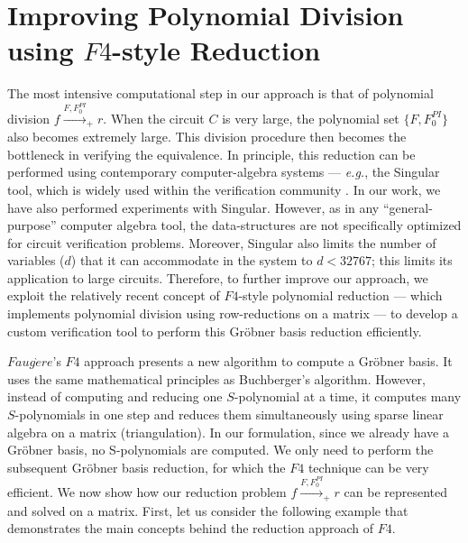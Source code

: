 \section{Improving Polynomial Division using $F4$-style Reduction}
\label{sec:f4}

The most intensive computational step in our approach is that of
polynomial division $f \stackrel{F,F_0^{PI}}{\longrightarrow}_+
r$. When the circuit $C$ is very large, the polynomial set
$\{F, F_0^{PI}\}$ also becomes extremely large. This division
procedure then becomes the bottleneck in verifying the equivalence.  
In principle, this reduction can be performed using contemporary
computer-algebra systems --- {\it e.g.},  the {\sc Singular}
\cite{DGPS} tool, which is widely used within the verification
community \cite{wienand:cav08} \cite{wedler:date11}
\cite{lv:date2012}. In our work, we have also performed experiments 
with {\sc Singular}. However, as in any ``general-purpose''
computer algebra tool, the data-structures are not specifically
optimized for circuit verification problems. Moreover, {\sc
  Singular} also limits the number of variables ($d$) that it can
accommodate in the system to $d < 32767$; this limits its
application to large circuits. Therefore, to further improve our
approach, we exploit the relatively recent concept of $F4$-style
polynomial reduction \cite{f4} --- which implements polynomial division
using row-reductions on a matrix --- to develop a custom
verification tool to perform this Gr\"obner basis reduction
efficiently.   

$Faug\grave{e}re$'s $F4$ approach \cite{f4} presents a new algorithm to
compute a Gr\"obner basis. It uses the same mathematical principles as
Buchberger's algorithm. However, instead of computing and reducing one 
$S$-polynomial at a time, it computes many $S$-polynomials in one
step and reduces them simultaneously using sparse linear algebra on a
matrix (triangulation). In our formulation, since we already have a
Gr\"obner basis, no S-polynomials are computed. We only need to
perform the subsequent Gr\"obner basis reduction, for which the $F4$
technique can be very efficient.  We now show how our reduction problem
$f\stackrel{F,F_0^{PI}}{\longrightarrow}_+r$ can be represented and
solved on a matrix. 
First, let us consider the following example that demonstrates the
main concepts behind the reduction approach of $F4$. 

